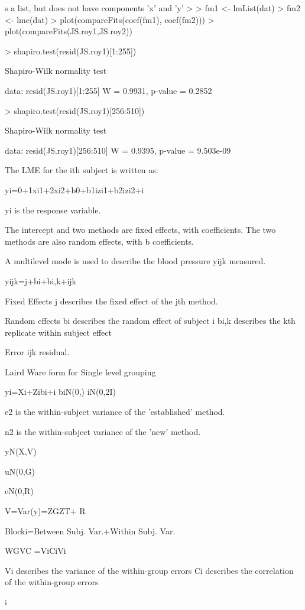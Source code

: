  s a list, but does not have components 'x' and 'y'
> 
> fm1 <- lmList(dat)
> fm2 <- lme(dat)
> plot(compareFits(coef(fm1), coef(fm2)))
> plot(compareFits(JS.roy1,JS.roy2))

> shapiro.test(resid(JS.roy1)[1:255])

        Shapiro-Wilk normality test

data:  resid(JS.roy1)[1:255]
W = 0.9931, p-value = 0.2852

> shapiro.test(resid(JS.roy1)[256:510])

        Shapiro-Wilk normality test

data:  resid(JS.roy1)[256:510]
W = 0.9395, p-value = 9.503e-09

 
The LME for the ith subject is written as:
 
yi=0+1xi1+2xi2+b0+b1izi1+b2izi2+i 
 
 yi is the response variable.
 
The intercept and two methods are fixed effects, with  coefficients.
The two methods are also random effects, with b coefficients.
 

A multilevel mode is used to describe the blood pressure yijk measured.
 
yijk=j+bi+bi,k+ijk
 
Fixed Effects 
j describes the fixed effect of the jth method.
 
Random effects
bi describes the random effect of subject i
bi,k describes the kth replicate within subject effect 
 
Error
ijk residual.
 
Laird Ware form for Single level grouping
 
yi=Xi+Zibi+i 
biN(0,)
iN(0,2I)
 
 
 
 
 
 

 
e2 is the within-subject variance of the 'established' method.
 
 
n2 is the within-subject variance of the 'new' method.
 
 
 
 
 
 
 
yN(X,V) 
 
uN(0,G)
 
eN(0,R)
  
V=Var(y)=ZGZT+ R
 
 
Blocki=Between Subj. Var.+Within Subj. Var. 
 
 
WGVC =ViCiVi
 
Vi describes the variance of the within-group errors 
Ci describes the correlation of the within-group errors 
 
i 
